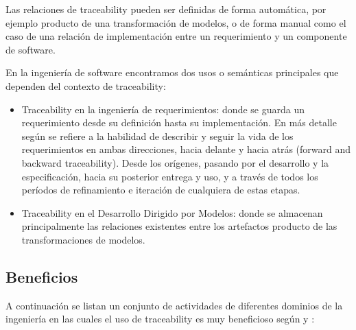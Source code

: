 \documentclass[a4paper,12pt,oneside]{book}
\begin{document}
Las relaciones de traceability pueden ser definidas de forma automática, por ejemplo producto de una transformación de modelos, o de forma manual como el caso de una relación de implementación entre un requerimiento y un componente de software.

En la ingeniería de software encontramos dos usos o semánticas principales que dependen del contexto de traceability:

\begin{itemize}

\item Traceability en la ingeniería de requerimientos: donde se guarda un requerimiento desde su definición hasta su implementación. En más detalle según \cite{GotelFinkelstein} se refiere a la habilidad de describir y seguir la vida de los requerimientos en ambas direcciones, hacia delante y hacia atrás (forward and backward traceability). Desde los orígenes, pasando por el desarrollo y la especificación, hacia su posterior entrega y uso, y a través de todos los períodos de refinamiento e iteración de cualquiera de estas etapas.

\item Traceability en el Desarrollo Dirigido por Modelos: donde se almacenan principalmente las relaciones existentes entre los artefactos producto de las transformaciones de modelos.

\end{itemize}

\subsection{Beneficios}

A continuación se listan un conjunto de actividades de diferentes dominios de la ingeniería en las cuales el uso de traceability es muy beneficioso según \cite{BrcinaRiebisch} y \cite{GrammelVoigt}:
\end{document}
